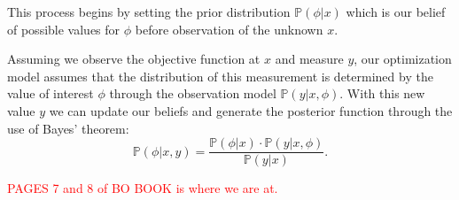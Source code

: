 This process begins by setting the prior distribution $\mathbb{P}(\phi | x)$ which is our belief of possible values for $\phi$ before observation of the unknown $x$. 

Assuming we observe the objective function at $x$ and measure $y$, our optimization model assumes that the distribution of this measurement is determined by the value of interest $\phi$ through the observation model $\mathbb{P}(y | x, \phi)$. With this new value $y$ we can update our beliefs and generate the posterior function through the use of Bayes' theorem: 
\[ \mathbb{P}(\phi | x, y) = \frac{\mathbb{P}(\phi | x) \cdot \mathbb{P}(y | x, \phi)}{\mathbb{P}(y | x)}. \] 

\textcolor{red}{PAGES 7 and 8 of BO BOOK is where we are at.}